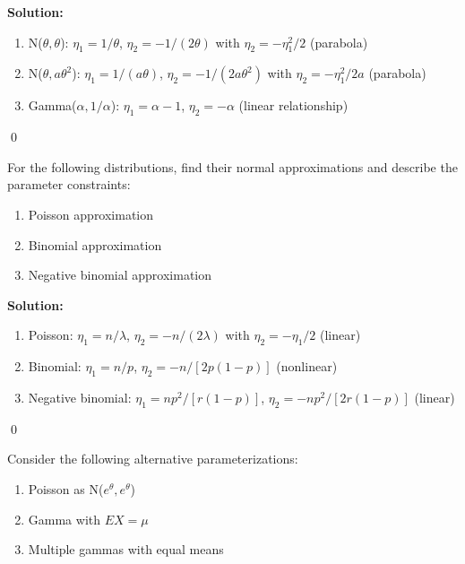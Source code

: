 \noindent\textbf{Solution:}
\begin{enumerate}[label=(\alph*)]
\item N($\theta,\theta$): $\eta_1 = 1/\theta$, $\eta_2 = -1/(2\theta)$ with $\eta_2 = -\eta_1^2/2$ (parabola)

\item N($\theta,a\theta^2$): $\eta_1 = 1/(a\theta)$, $\eta_2 = -1/(2a\theta^2)$ with $\eta_2 = -\eta_1^2/2a$ (parabola)

\item Gamma($\alpha,1/\alpha$): $\eta_1 = \alpha-1$, $\eta_2 = -\alpha$ (linear relationship)
\end{enumerate}


\qed
\begin{problembox}
For the following distributions, find their normal approximations and describe the parameter constraints:
\begin{enumerate}[label=(\alph*)]
\item Poisson approximation
\item Binomial approximation
\item Negative binomial approximation
\end{enumerate}
\end{problembox}

\noindent\textbf{Solution:}
\begin{enumerate}[label=(\alph*)]
\item Poisson: $\eta_1 = n/\lambda$, $\eta_2 = -n/(2\lambda)$ with $\eta_2 = -\eta_1/2$ (linear)

\item Binomial: $\eta_1 = n/p$, $\eta_2 = -n/[2p(1-p)]$ (nonlinear)

\item Negative binomial: $\eta_1 = np^2/[r(1-p)]$, $\eta_2 = -np^2/[2r(1-p)]$ (linear)
\end{enumerate}


\qed
\begin{problembox}
Consider the following alternative parameterizations:
\begin{enumerate}[label=(\alph*)]
\item Poisson as N($e^\theta,e^\theta$)
\item Gamma with $EX = \mu$
\item Multiple gammas with equal means
\end{enumerate}
\end{problembox}


